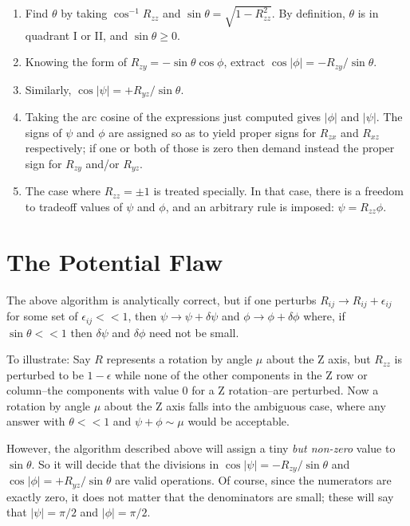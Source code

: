 \begin{enumerate}
\item 
Find $\theta$ by taking $\cos^{-1} R_{zz}$ and  
$\sin \theta = \sqrt{1-R_{zz}^2}$.  By definition, 
$\theta$ is in quadrant I or II, and $\sin \theta \geq 0$.
\item 
Knowing the form of $R_{zy} = - \sin \theta \cos \phi$, extract 
$\cos | \phi | = - R_{zy} / \sin \theta$.  
\item
Similarly, 
$\cos | \psi | = + R_{yz} / \sin \theta$.
\item
Taking the arc cosine of the expressions just computed gives 
$|\phi|$ and $|\psi|$.  The signs of $\psi$ and $\phi$ 
are assigned so as to yield 
proper signs for $R_{zx}$ and $R_{xz}$ respectively; 
if one or both of those is zero then demand instead the proper sign for
$R_{zy}$ and/or $R_{yz}$. 
\item 
The case where $R_{zz} = \pm 1$ is treated specially.  In that case, there
is a freedom to tradeoff  values of $\psi$ and $\phi$, and an arbitrary rule is 
imposed:  $\psi = R_{zz} \phi$.
\end{enumerate}

\section{The Potential Flaw}

The above algorithm is analytically correct, but if one perturbs 
$R_{ij} \rightarrow R_{ij}+\epsilon_{ij}$ for some set of  
$\epsilon_{ij} << 1$, then $\psi \rightarrow \psi + \delta \psi$ and
$\phi \rightarrow \phi + \delta \phi$ where, if $\sin \theta << 1$
then $\delta \psi$ and $\delta \phi$ need not be small.

To illustrate:  Say $R$ represents a rotation by angle $\mu$ about the Z axis,
but $R_{zz}$ is perturbed to be $1 - \epsilon$ 
while none of the other components
in the Z row or column--the components with value 0 for a Z rotation--are 
perturbed.   Now a rotation by angle $\mu$ about the Z axis falls into the 
ambiguous case, where any answer with $\theta << 1$ and $\psi + \phi \sim \mu$
would be acceptable.  

However, the algorithm described above will assign
a tiny {\em but non-zero} value to $\sin \theta$.  So it will decide that the
divisions in $\cos | \psi | = - R_{zy} / \sin \theta$ and 
$\cos | \phi | = + R_{yz} / \sin \theta$ are valid operations.  
Of course, since the numerators are exactly zero, it does not matter that
the denominators are small; these will say that $ |\psi| = \pi /2$
and $ |\phi| = \pi /2$.  

